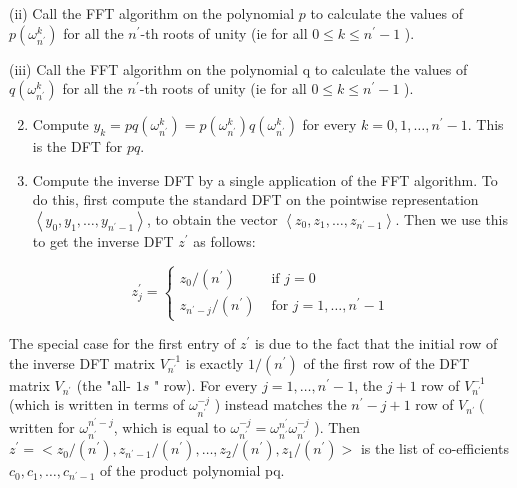 (ii) Call the FFT algorithm on the polynomial $p$ to calculate the values of $p\left(\omega_{n^{\prime}}^{k}\right)$ for all the $n^{\prime}$-th roots of unity (ie for all $0 \leq k \leq n^{\prime}-1$ ).

(iii) Call the FFT algorithm on the polynomial q to calculate the values of $q\left(\omega_{n^{\prime}}^{k}\right)$ for all the $n^{\prime}$-th roots of unity (ie for all $0 \leq k \leq n^{\prime}-1$ ).

\begin{enumerate}
  \setcounter{enumi}{1}
  \item Compute $y_{k}=p q\left(\omega_{n^{\prime}}^{k}\right)=p\left(\omega_{n^{\prime}}^{k}\right) q\left(\omega_{n^{\prime}}^{k}\right)$ for every $k=0,1, \ldots, n^{\prime}-1$. This is the DFT for $p q$.

  \item Compute the inverse DFT by a single application of the FFT algorithm. To do this, first compute the standard DFT on the pointwise representation $\left\langle y_{0}, y_{1}, \ldots, y_{n^{\prime}-1}\right\rangle$, to obtain the vector $\left\langle z_{0}, z_{1}, \ldots, z_{n^{\prime}-1}\right\rangle$. Then we use this to get the inverse DFT $z^{\prime}$ as follows:

\end{enumerate}

$$
z_{j}^{\prime}=\left\{\begin{array}{cl}
z_{0} /\left(n^{\prime}\right) & \text { if } j=0 \\
z_{n^{\prime}-j} /\left(n^{\prime}\right) & \text { for } j=1, \ldots, n^{\prime}-1
\end{array}\right.
$$

The special case for the first entry of $z^{\prime}$ is due to the fact that the initial row of the inverse DFT matrix $V_{n^{\prime}}^{-1}$ is exactly $1 /\left(n^{\prime}\right)$ of the first row of the DFT matrix $V_{n^{\prime}}$ (the "all- $1 s$ " row). For every $j=1, \ldots, n^{\prime}-1$, the $j+1$ row of $V_{n^{\prime}}^{-1}$ (which is written in terms of $\omega_{n^{\prime}}^{-j}$ ) instead matches the $n^{\prime}-j+1$ row of $V_{n^{\prime}}\left(\right.$ written for $\omega_{n^{\prime}}^{n^{\prime}-j}$, which is equal to $\omega_{n^{\prime}}^{-j}=\omega_{n^{\prime}}^{n^{\prime}} \omega_{n^{\prime}}^{-j}$ ). Then $z^{\prime}=<z_{0} /\left(n^{\prime}\right), z_{n^{\prime}-1} /\left(n^{\prime}\right), \ldots, z_{2} /\left(n^{\prime}\right), z_{1} /\left(n^{\prime}\right)>$ is the list of co-efficients $c_{0}, c_{1}, \ldots, c_{n^{\prime}-1}$ of the product polynomial pq.

